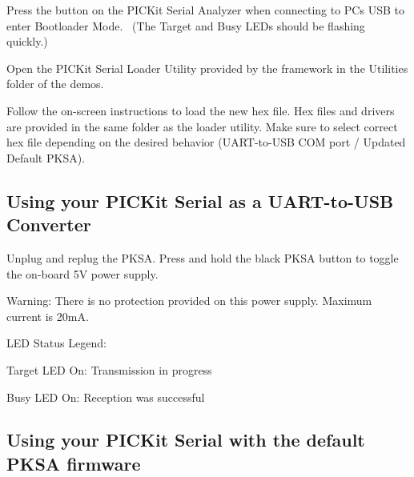 \begin{DoxyEnumerate}
\item Press the button on the P\+I\+C\+Kit Serial Analyzer when connecting to P\+C\textquotesingle{}s U\+S\+B to enter {\ttfamily Bootloader Mode}.~\newline
 (The \textquotesingle{}Target\textquotesingle{} and \textquotesingle{}Busy\textquotesingle{} L\+E\+Ds should be flashing quickly.) 
\item Open the P\+I\+C\+Kit Serial Loader Utility provided by the framework in the Utilities folder of the demos. 
\item Follow the on-\/screen instructions to load the new hex file. Hex files and drivers are provided in the same folder as the loader utility. Make sure to select correct hex file depending on the desired behavior (U\+A\+R\+T-\/to-\/\+U\+S\+B C\+O\+M port / Updated Default P\+K\+S\+A). 
\end{DoxyEnumerate}\hypertarget{_p_k_s_a_r_s232_Use}{}\subsection{Using your P\+I\+C\+Kit Serial as a U\+A\+R\+T-\/to-\/\+U\+S\+B Converter}\label{_p_k_s_a_r_s232_Use}

\begin{DoxyEnumerate}
\item Unplug and replug the P\+K\+S\+A. Press and hold the black P\+K\+S\+A button to toggle the on-\/board 5\+V power supply. 
\begin{DoxyItemize}
\item Warning\+: There is no protection provided on this power supply. Maximum current is 20m\+A. 
\end{DoxyItemize}
\item L\+E\+D Status Legend\+: 
\begin{DoxyItemize}
\item Target L\+E\+D On\+: Transmission in progress 
\item Busy L\+E\+D On\+: Reception was successful 
\end{DoxyItemize}
\end{DoxyEnumerate}\hypertarget{_p_k_s_a_r_s232_UseNormal}{}\subsection{Using your P\+I\+C\+Kit Serial with the default P\+K\+S\+A firmware}\label{_p_k_s_a_r_s232_UseNormal}

